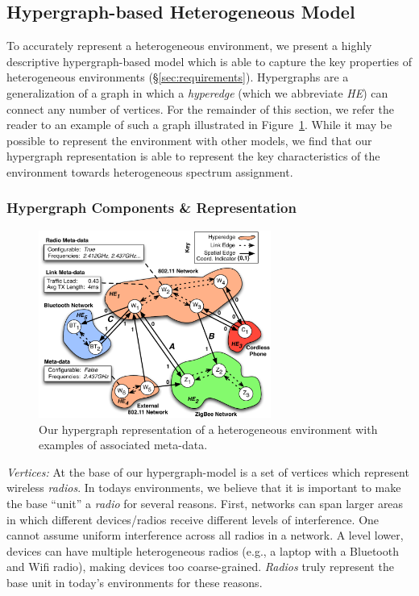 
\subsection{Hypergraph-based Heterogeneous Model}
\label{sec:model}

To accurately represent a heterogeneous environment, we present a highly descriptive hypergraph-based model which is able to capture the key properties of heterogeneous environments (\S\ref{sec:requirements}).  Hypergraphs are a generalization of a graph in which a \emph{hyperedge} (which we abbreviate \emph{HE}) can connect any number of vertices.  For the remainder of this section, we refer the reader to an example of such a graph illustrated in Figure~\ref{fig:hypergraph}.  While it may be possible to represent the environment with other models, we find that our hypergraph representation is able to represent the key characteristics of the environment towards heterogeneous spectrum assignment. 

\subsubsection{Hypergraph Components \& Representation}

\begin{figure}[t]
\centering
\includegraphics[width=3in]{figures/hypergraph}
\vspace{-0.2in}
\caption{\label{fig:hypergraph} \small Our hypergraph representation of a heterogeneous environment with examples of associated meta-data.}
\center
\vspace{-0.1in}
\end{figure}

\smallskip
\emph{Vertices:} At the base of our hypergraph-model is a set of vertices which represent wireless \emph{radios}.  In todays environments, we believe that it is important to make the base ``unit'' a \emph{radio} for several reasons.  First, networks can span larger areas in which different devices/radios receive different levels of interference.  One cannot assume uniform interference across all radios in a network.  A level lower, devices can have multiple heterogeneous radios (e.g., a laptop with a Bluetooth and Wifi radio), making devices too coarse-grained.  \emph{Radios} truly represent the base unit in today's environments for these reasons.

